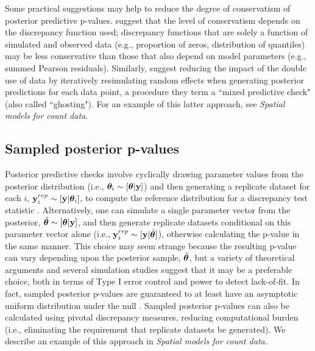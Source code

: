 \documentclass[12pt,english]{article}
\begin{document}
\begin{spacing}{1.9}
Some practical suggestions may help to reduce the degree of conservatism of posterior predictive p-values.  \citet{LunnEtAl2013} suggest that the level of conservatism depends on the discrepancy function used; discrepancy functions that are solely a function of simulated and observed data (e.g., proportion of zeros, distribution of quantiles) may be less conservative than those that also depend on model parameters (e.g., summed Pearson residuals).  Similarly, \citet{MarshallSpiegelhalter2003} suggest reducing the impact of the double use of data by iteratively resimulating random effects when generating posterior predictions for each data point, a procedure they term a ``mixed predictive check" (also called ``ghosting").  For an example of this latter approach, see \textit{Spatial models for count data}.

\subsection{Sampled posterior p-values}

Posterior predictive checks involve cyclically drawing parameter values from the posterior distribution (i.e., $\boldsymbol{\theta}_i \sim [\boldsymbol{\theta}| {\bf y}]$) and then generating a replicate dataset for each $i$, ${\bf y}_i^{rep} \sim [{\bf y} | \boldsymbol{\theta}_i]$, to compute the reference distribution for a discrepancy test statistic \citep[][; Appendix A, Alg. 2]{GelmanEtAl2004}.  Alternatively, one can simulate a single parameter vector from the posterior, $\tilde{\boldsymbol{\theta}} \sim [\boldsymbol{\theta}| {\bf y}]$, and then generate replicate datasets conditional on this parameter vector alone (i.e., ${\bf y}_i^{rep} \sim [{\bf y} | \tilde{\boldsymbol{\theta}}]$), otherwise calculating the p-value in the same manner.  This choice may seem strange because the resulting p-value can vary depending upon the posterior sample, $\tilde{\boldsymbol{\theta}}$, but a variety of theoretical arguments \citep[e.g.,][]{Johnson2004,Johnson2007,YuanJohnson2012,Gosselin2011} and several simulation studies \citep[e.g.,][]{Gosselin2011,Zhang2014} suggest that it may be a preferable choice, both in terms of Type I error control and power to detect lack-of-fit.  In fact, sampled posterior p-values are guaranteed to at least have an asymptotic uniform distribution under the null \citep[i.e., when the model fit to the data is the ``true" model][]{Gosselin2011}.  Sampled posterior p-values can also be calculated using pivotal discrepancy measures, reducing computational burden (i.e., eliminating the requirement that replicate datasets be generated). We describe an example of this approach in \textit{Spatial models for count data}.


\end{spacing}
\end{document}
